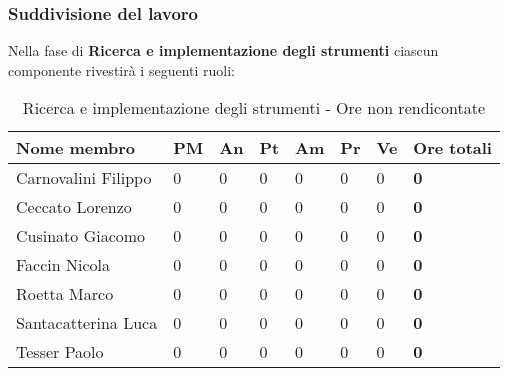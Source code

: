 		\subsubsection{Suddivisione del lavoro} %
		\label{ssub:suddivisione_del_lavoro}
		Nella fase di \textbf{Ricerca e implementazione degli strumenti} ciascun componente rivestirà i seguenti ruoli: \\
			\begin{table}[!h]
				\begin{center}
					\begin{tabularx}{0.9\textwidth}{|l|l|l|l|l|l|l|X|}
						\hline
						\textbf{Nome membro} & \textbf{PM} & \textbf{An} & \textbf{Pt} & \textbf{Am} & \textbf{Pr} & \textbf{Ve} & \textbf{Ore totali} \\
						\hline
						Carnovalini Filippo & 0 & 0 & 0 & 0 & 0 & 0 & \textbf{0} \\
						\hline
						Ceccato Lorenzo & 0 & 0 & 0 & 0 & 0 & 0 & \textbf{0} \\
						\hline
						Cusinato Giacomo & 0 & 0 & 0 & 0 & 0 & 0 & \textbf{0} \\
						\hline
						Faccin Nicola & 0 & 0 & 0 & 0 & 0 & 0 & \textbf{0} \\
						\hline
						Roetta Marco & 0 & 0 & 0 & 0 & 0 & 0 & \textbf{0} \\
						\hline
						Santacatterina Luca & 0 & 0 & 0 & 0 & 0 & 0 & \textbf{0} \\
						\hline
						Tesser Paolo & 0 & 0 & 0 & 0 & 0 & 0 & \textbf{0} \\
						\hline
					\end{tabularx}
				\end{center}
			\caption{Ricerca e implementazione degli strumenti - Ore non rendicontate}
			\end{table}
		
